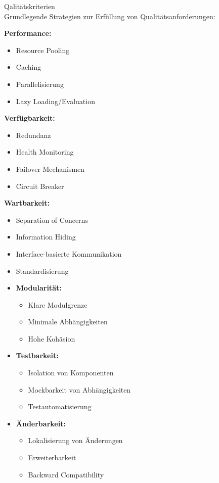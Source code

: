 \begin{theorem}{Qalitätskriterien}\\
Grundlegende Strategien zur Erfüllung von Qualitätsanforderungen:

\textbf{Performance:}
\begin{itemize}
    \item Resource Pooling
    \item Caching
    \item Parallelisierung
    \item Lazy Loading/Evaluation
\end{itemize}

\textbf{Verfügbarkeit:}
\begin{itemize}
    \item Redundanz
    \item Health Monitoring
    \item Failover Mechanismen
    \item Circuit Breaker
\end{itemize}

\textbf{Wartbarkeit:}
\begin{itemize}
    \item Separation of Concerns
    \item Information Hiding
    \item Interface-basierte Kommunikation
    \item Standardisierung
\end{itemize}

\begin{itemize}
    \item \textbf{Modularität:}
    \begin{itemize}
        \item Klare Modulgrenze
        \item Minimale Abhängigkeiten
        \item Hohe Kohäsion
    \end{itemize}
    
    \item \textbf{Testbarkeit:}
    \begin{itemize}
        \item Isolation von Komponenten
        \item Mockbarkeit von Abhängigkeiten
        \item Testautomatisierung
    \end{itemize}
    
    \item \textbf{Änderbarkeit:}
    \begin{itemize}
        \item Lokalisierung von Änderungen
        \item Erweiterbarkeit
        \item Backward Compatibility
    \end{itemize}


\end{itemize}
\end{theorem}
